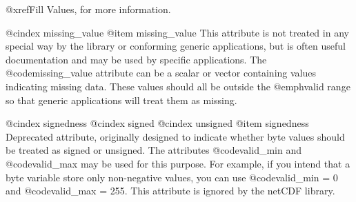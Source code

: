 @xref{Fill Values}, for more information.

@cindex missing_value
@item missing_value
This attribute is not treated in any special way by the library or conforming
generic applications, but is often useful documentation and may be used by
specific applications.
The @code{missing_value} attribute
can be a scalar or vector containing values indicating missing data.
These values should all be outside the @emph{valid range} so that generic
applications will treat them as missing.

@cindex signedness
@cindex signed
@cindex unsigned
@item signedness
Deprecated attribute, originally designed to indicate whether byte
values should be treated as signed or unsigned.  The attributes
@code{valid_min} and @code{valid_max} may be used for this purpose.  For
example, if you intend that a byte variable store only non-negative
values, you can use @code{valid_min = 0} and @code{valid_max = 255}.
This attribute is ignored by the netCDF library.

